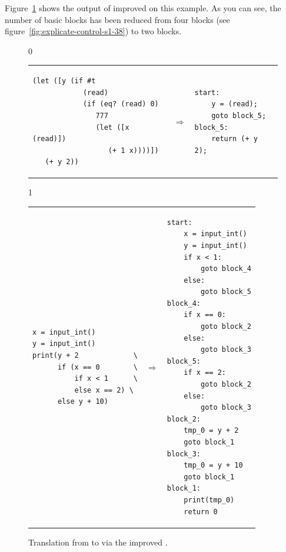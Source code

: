 \documentclass[7x10]{TimesAPriori_MIT}%
\def\racketEd{0}
\def\pythonEd{1}
\def\edition{0}
\numberwithin{theorem}{chapter}
\numberwithin{definition}{chapter}
\numberwithin{equation}{chapter}
\begin{document}
Figure~\ref{fig:explicate-control-challenge} shows the output of
improved  on this example.  As you can
see, the number of basic blocks has been reduced from four blocks (see
figure~\ref{fig:explicate-control-s1-38}) to two blocks.

\begin{figure}[tbp]
  \begin{tcolorbox}[colback=white]
    {\if\edition\racketEd        
\begin{tabular}{lll}
\begin{minipage}{0.4\textwidth}
\begin{lstlisting}
(let ([y (if #t
            (read)
            (if (eq? (read) 0)
               777
               (let ([x (read)])
                  (+ 1 x))))])
   (+ y 2))
\end{lstlisting}
\end{minipage}
&
$\Rightarrow$
&
\begin{minipage}{0.55\textwidth}
\begin{lstlisting}
start:
    y = (read);
    goto block_5;
block_5:
    return (+ y 2);
\end{lstlisting}
\end{minipage}
\end{tabular} 
\fi}
{\if\edition\pythonEd
\begin{tabular}{lll}
\begin{minipage}{0.4\textwidth}
\begin{lstlisting}
x = input_int()
y = input_int()
print(y + 2             \
      if (x == 0        \
          if x < 1      \
          else x == 2) \
      else y + 10)
\end{lstlisting}
\end{minipage}
&
$\Rightarrow$
&
\begin{minipage}{0.55\textwidth}
\begin{lstlisting}
start:
    x = input_int()
    y = input_int()
    if x < 1:
        goto block_4
    else:
        goto block_5
block_4:
    if x == 0:
        goto block_2
    else:
        goto block_3
block_5:
    if x == 2:
        goto block_2
    else:
        goto block_3
block_2:
    tmp_0 = y + 2
    goto block_1
block_3:
    tmp_0 = y + 10
    goto block_1
block_1:
    print(tmp_0)
    return 0
\end{lstlisting}
\end{minipage}
\end{tabular} 
\fi}
  \end{tcolorbox}

  \caption{Translation from \LangIf{} to \LangCIf{}
  via the improved .}
\label{fig:explicate-control-challenge}
\end{figure}
\end{document}
